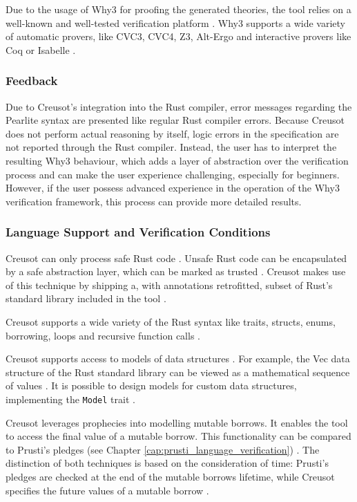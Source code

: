 Due to the usage of Why3 for proofing the generated theories, the tool relies on a well-known and well-tested verification platform \cite{riesco_creusot_2022}. Why3 supports a wide variety of automatic provers, like CVC3, CVC4, Z3, Alt-Ergo and interactive provers like Coq or Isabelle \cite{why3_why3_2023}. 

\subsubsection{Feedback}
Due to Creusot's integration into the Rust compiler, error messages regarding the Pearlite syntax are presented like regular Rust compiler errors. Because Creusot does not perform actual reasoning by itself, logic errors in the specification are not reported through the Rust compiler. Instead, the user has to interpret the resulting Why3 behaviour, which adds a layer of abstraction over the verification process and can make the user experience challenging, especially for beginners. However, if the user possess advanced experience in the operation of the Why3 verification framework, this process can provide more detailed results.

\subsubsection{Language Support and Verification Conditions}
Creusot can only process safe Rust code \cite{riesco_creusot_2022}. Unsafe Rust code can be encapsulated by a safe abstraction layer, which can be marked as trusted \cite{riesco_creusot_2022}. Creusot makes use of this technique by shipping a, with annotations retrofitted, subset of Rust's standard library included in the tool \cite{denis_creusot_2021}.

Creusot supports a wide variety of the Rust syntax like traits, structs, enums, borrowing, loops and recursive function calls \cite{denis_creusot_2021}.

Creusot supports access to models of data structures \cite{denis_creusot_2021}. For example, the Vec data structure of the Rust standard library can be viewed as a mathematical sequence of values \cite{denis_creusot_2021}. It is possible to design models for custom data structures, implementing the \lstinline{Model} trait \cite{denis_creusot_2021,xavier_denis_xldeniscreusot_2023}.

Creusot leverages prophecies into modelling mutable borrows. It enables the tool to access the final value of a mutable borrow. This functionality can be compared to Prusti's pledges (see Chapter \ref{cap:prusti_language_verification}) \cite{denis_creusot_2021,riesco_creusot_2022}. The distinction of both techniques is based on the consideration of time: Prusti's pledges are checked at the end of the mutable borrows lifetime, while Creusot specifies the future values of a mutable borrow \cite{denis_creusot_2021}.

